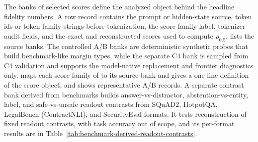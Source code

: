 The banks of selected scores define the analyzed object behind the headline
fidelity numbers. A row record contains the prompt or hidden-state source,
token ids or token-family strings before tokenization, the score-family label,
tokenizer-audit fields, and the exact and reconstructed scores used to compute
\(\rho_{0.5}\).  lists the source banks. The
controlled A/B banks are deterministic synthetic probes that build
benchmark-like margin types, while the separate C4 bank is sampled from C4 validation and supports the
model-native replacement and frontier diagnostics only.  maps each
score family of  to its source bank
and gives a one-line definition of the score object, and
 shows representative A/B records.
A separate contrast bank derived from benchmarks builds answer-vs-distractor,
abstention-vs-entity, label, and safe-vs-unsafe readout contrasts from SQuAD2,
HotpotQA, LegalBench (ContractNLI), and SecurityEval formats. It tests
reconstruction of fixed readout contrasts, with task accuracy out of scope, and its
per-format results are in
Table~\ref{tab:benchmark-derived-readout-contrasts}.

